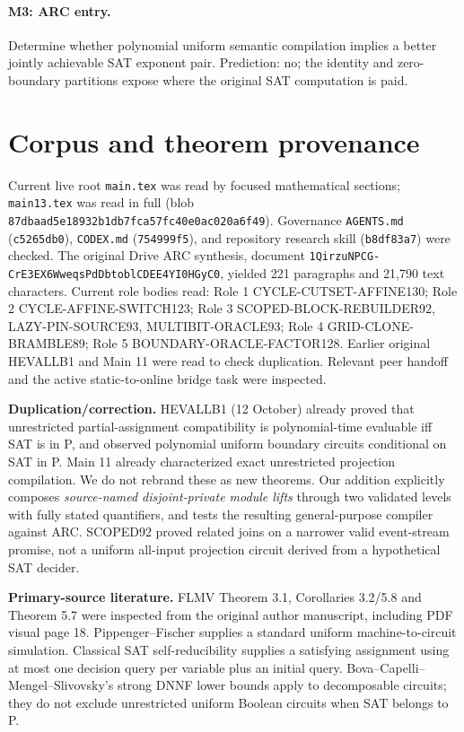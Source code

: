 \documentclass[11pt]{article}
\begin{document}
\paragraph{M3: ARC entry.} Determine whether polynomial uniform semantic compilation implies a better jointly achievable SAT exponent pair. Prediction: no; the identity and zero-boundary partitions expose where the original SAT computation is paid.

\section{Corpus and theorem provenance}
Current live root \texttt{main.tex} was read by focused mathematical sections; \texttt{main13.tex} was read in full (blob \texttt{87dbaad5e18932b1db7fca57fc40e0ac020a6f49}). Governance \texttt{AGENTS.md} (\texttt{c5265db0}), \texttt{CODEX.md} (\texttt{754999f5}), and repository research skill (\texttt{b8df83a7}) were checked. The original Drive ARC synthesis, document \texttt{1QirzuNPCG-CrE3EX6WweqsPdDbtoblCDEE4YI0HGyC0}, yielded 221 paragraphs and 21,790 text characters. Current role bodies read: Role 1 CYCLE-CUTSET-AFFINE130; Role 2 CYCLE-AFFINE-SWITCH123; Role 3 SCOPED-BLOCK-REBUILDER92, LAZY-PIN-SOURCE93, MULTIBIT-ORACLE93; Role 4 GRID-CLONE-BRAMBLE89; Role 5 BOUNDARY-ORACLE-FACTOR128. Earlier original HEVALLB1 and Main 11 were read to check duplication. Relevant peer handoff and the active static-to-online bridge task were inspected.

\noindent\textbf{Duplication/correction.} HEVALLB1 (12 October) already proved that unrestricted partial-assignment compatibility is polynomial-time evaluable iff SAT is in P, and observed polynomial uniform boundary circuits conditional on SAT in P. Main 11 already characterized exact unrestricted projection compilation. We do not rebrand these as new theorems. Our addition explicitly composes \emph{source-named disjoint-private module lifts} through two validated levels with fully stated quantifiers, and tests the resulting general-purpose compiler against ARC. SCOPED92 proved related joins on a narrower valid event-stream promise, not a uniform all-input projection circuit derived from a hypothetical SAT decider.

\noindent\textbf{Primary-source literature.} FLMV Theorem 3.1, Corollaries 3.2/5.8 and Theorem 5.7 were inspected from the original author manuscript, including PDF visual page 18. Pippenger--Fischer supplies a standard uniform machine-to-circuit simulation. Classical SAT self-reducibility supplies a satisfying assignment using at most one decision query per variable plus an initial query. Bova--Capelli--Mengel--Slivovsky's strong DNNF lower bounds apply to decomposable circuits; they do not exclude unrestricted uniform Boolean circuits when SAT belongs to P.
\end{document}
